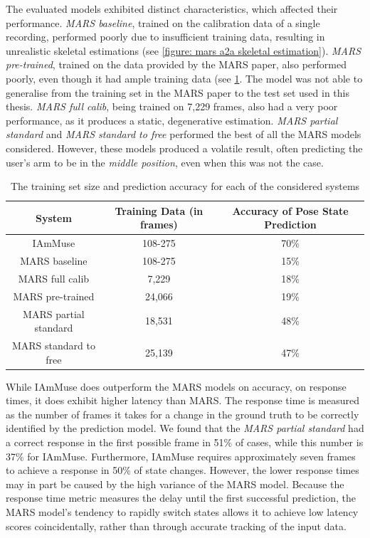 The evaluated models exhibited distinct characteristics, which affected their performance.
\textit{MARS baseline}, trained on the calibration data of a single recording, performed poorly due to insufficient training data, resulting in unrealistic skeletal estimations (see \cref{figure: mars a2a skeletal estimation}).
\textit{MARS pre-trained}, trained on the data provided by the MARS paper, also performed poorly, even though it had ample training data (see \cref{table: accuracy vs training data}.
The model was not able to generalise from the training set in the MARS paper to the test set used in this thesis.
\textit{MARS full calib}, being trained on 7,229 frames, also had a very poor performance, as it produces a static, degenerative estimation.
\textit{MARS partial standard} and \textit{MARS standard to free} performed the best of all the MARS models considered.
However, these models produced a volatile result, often predicting the user's arm to be in the \textit{middle position}, even when this was not the case.


\begin{table}[!htb]
    \centering
    \begin{tabular}{c|c|c}
         System & Training Data (in frames) & Accuracy of Pose State Prediction  \\
         \hline
         IAmMuse & 108-275 & 70\% \\
         MARS baseline & 108-275 & 15\% \\
         MARS full calib & 7,229 & 18\% \\
         MARS pre-trained & 24,066 & 19\% \\
         MARS partial standard & 18,531 & 48\% \\
         MARS standard to free & 25,139 & 47\% \\
    \end{tabular}
    \caption{The training set size and prediction accuracy for each of the considered systems}
    \label{table: accuracy vs training data}
\end{table}

While IAmMuse does outperform the MARS models on accuracy, on response times, it does exhibit higher latency than MARS.
The response time is measured as the number of frames it takes for a change in the ground truth to be correctly identified by the prediction model.
We found that the \textit{MARS partial standard} had a correct response in the first possible frame in 51\% of cases, while this number is 37\% for IAmMuse.
Furthermore, IAmMuse requires approximately seven frames to achieve a response in 50\% of state changes.
However, the lower response times may in part be caused by the high variance of the MARS model.
Because the response time metric measures the delay until the first successful prediction, the MARS model's tendency to rapidly switch states allows it to achieve low latency scores coincidentally, rather than through accurate tracking of the input data.



